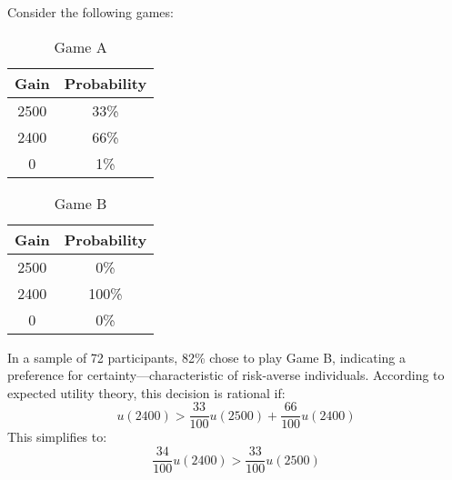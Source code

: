 \begin{example}
    Consider the following games: 
    \begin{table}[H]
        \centering
        \begin{tabular}{|c|c|}
        \hline
        \textbf{Gain} & \textbf{Probability} \\ \hline
        2500          & 33\%                  \\ \hline
        2400          & 66\%                  \\ \hline
        0             & 1\%                   \\ \hline
        \end{tabular}
        \caption{Game A}
    \end{table}
    \begin{table}[H]
        \centering
        \begin{tabular}{|c|c|}
        \hline
        \textbf{Gain} & \textbf{Probability} \\ \hline
        2500          & 0\%                  \\ \hline
        2400          & 100\%                  \\ \hline
        0             & 0\%                   \\ \hline
        \end{tabular}
        \caption{Game B}
    \end{table}
    In a sample of 72 participants, 82\% chose to play Game B, indicating a preference for certainty—characteristic of risk-averse individuals. 
    According to expected utility theory, this decision is rational if:
    \[u(2400)>\frac{33}{100}u(2500)+\frac{66}{100}u(2400)\] 
    This simplifies to:
    \[\frac{34}{100}u(2400)>\frac{33}{100}u(2500)\]


\end{example}
